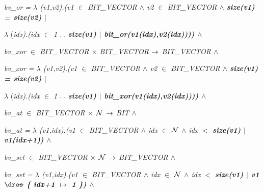 \begin{sloppypar}
\hspace*{0.20in}\it bv\_or \rm =  $\lambda$ \rm (\it v1\rm ,\it v2\rm )\rm .\rm (\it v1 $\in$  \it BIT\_VECTOR  $\land$  \it v2  $\in$  \it BIT\_VECTOR  $\land$  \bf size\rm (\it v1\rm ) \rm = \bf size\rm (\it v2\rm )  $\mid$  

\hspace*{0.40in} $\lambda$ \rm (\it idx\rm )\rm .\rm (\it idx  $\in$  \rm 1 $\mathbin{\ldotp\ldotp}$ \bf size\rm (\it v1\rm )  $\mid$  \it bit\_or\rm (\it v1\rm (\it idx\rm )\rm ,\it v2\rm (\it idx\rm )\rm )\rm )\rm )  $\land$ 

\vspace*{4mm}
\hspace*{0.20in}\it bv\_xor  $\in$  \it BIT\_VECTOR  $\times$  \it BIT\_VECTOR  $\rightarrow$  \it BIT\_VECTOR  $\land$ 

\hspace*{0.20in}\it bv\_xor \rm =  $\lambda$ \rm (\it v1\rm ,\it v2\rm )\rm .\rm (\it v1 $\in$  \it BIT\_VECTOR  $\land$  \it v2  $\in$  \it BIT\_VECTOR  $\land$  \bf size\rm (\it v1\rm ) \rm = \bf size\rm (\it v2\rm )  $\mid$  

\hspace*{0.40in} $\lambda$ \rm (\it idx\rm )\rm .\rm (\it idx  $\in$  \rm 1 $\mathbin{\ldotp\ldotp}$ \bf size\rm (\it v1\rm )  $\mid$  \it bit\_xor\rm (\it v1\rm (\it idx\rm )\rm ,\it v2\rm (\it idx\rm )\rm )\rm )\rm )  $\land$ 

\vspace*{4mm}
\hspace*{0.20in}\it bv\_at  $\in$  \it BIT\_VECTOR  $\times$   $\mbox{${\cal N}$}$   $\rightarrow$  \it BIT  $\land$ 

\hspace*{0.20in}\it bv\_at \rm =  $\lambda$ \rm (\it v1\rm ,\it idx\rm )\rm .\rm (\it v1 $\in$  \it BIT\_VECTOR  $\land$  \it idx  $\in$   $\mbox{${\cal N}$}$   $\land$  \it idx $<$ \bf size\rm (\it v1\rm )  $\mid$  \it v1\rm (\it idx\rm +\rm 1\rm )\rm )  $\land$ 

\vspace*{4mm}
\hspace*{0.20in}\it bv\_set  $\in$  \it BIT\_VECTOR  $\times$   $\mbox{${\cal N}$}$   $\rightarrow$  \it BIT\_VECTOR  $\land$ 

\hspace*{0.20in}\it bv\_set \rm =  $\lambda$ \rm (\it v1\rm ,\it idx\rm )\rm .\rm (\it v1 $\in$  \it BIT\_VECTOR  $\land$  \it idx  $\in$   $\mbox{${\cal N}$}$   $\land$  \it idx $<$ \bf size\rm (\it v1\rm )  $\mid$  \it v1  $\lover$  \rm \{ \it idx\rm +\rm 1  $\mapsto$  \rm 1 \rm \}\rm )  $\land$ 


\end{sloppypar}
